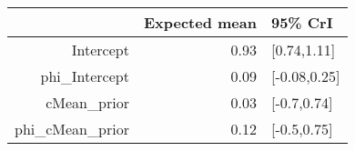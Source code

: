 \begin{tabular}{rrl}
  \hline
 & Expected mean & 95\% CrI \\ 
  \hline
Intercept & 0.93 & [0.74,1.11] \\ 
  phi\_Intercept & 0.09 & [-0.08,0.25] \\ 
  cMean\_prior & 0.03 & [-0.7,0.74] \\ 
  phi\_cMean\_prior & 0.12 & [-0.5,0.75] \\ 
   \hline
\end{tabular}

